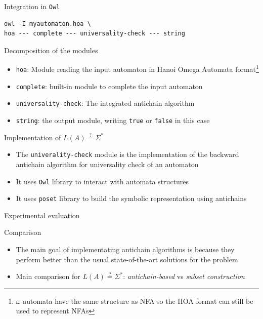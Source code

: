 \documentclass[10pt]{beamer}
\begin{document}
\begin{frame}[fragile]{Integration in \texttt{Owl}}

\begin{lstlisting}
owl -I myautomaton.hoa \
hoa --- complete --- universality-check --- string
\end{lstlisting}

\begin{block}{Decomposition of the modules}
\begin{itemize}
  \item \texttt{hoa}: Module reading the input automaton in Hanoi Omega Automata format\footnote{$\omega$-automata have the same structure as NFA so the HOA format can still be used to represent NFAs}
  \item \texttt{complete}: built-in module to complete the input automaton
  \item \texttt{universality-check}: The integrated antichain algorithm
  \item \texttt{string}: the output module, writing \texttt{true} or \texttt{false} in this case
\end{itemize}

\end{block}

\end{frame}

\begin{frame}{Implementation of $L(A) \stackrel{?}{=} \Sigma^*$ }

\begin{block}{}
\begin{itemize}
  \item The \texttt{univerality-check} module is the implementation of the backward antichain algorithm for universality check of an automaton \cite{antichain-universality}
  \item It uses \texttt{Owl} library to interact with automata structures
  \item It uses \texttt{poset} library to build the symbolic representation using antichains
\end{itemize}
\end{block}
\end{frame}

\begin{frame}{Experimental evaluation}

\begin{block}{Comparison}
  \begin{itemize}
    \item The main goal of implementating antichain algorithms is because they perform better than the usual state-of-the-art solutions for the problem
    \item Main comparison for $L(A) \stackrel{?}{=} \Sigma^*$: \textit{antichain-based} vs \textit{subset construction}
  \end{itemize}
\end{block}

\end{frame}
\end{document}
